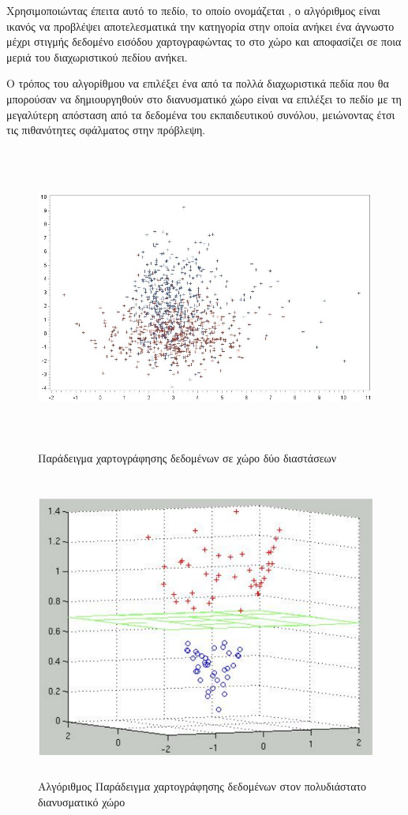 Χρησιμοποιώντας έπειτα αυτό το πεδίο, το οποίο ονομάζεται , ο αλγόριθμος είναι ικανός να προβλέψει αποτελεσματικά την κατηγορία στην οποία ανήκει ένα άγνωστο μέχρι στιγμής δεδομένο εισόδου χαρτογραφώντας το στο χώρο και αποφασίζει σε ποια μεριά του διαχωριστικού πεδίου ανήκει. 

Ο τρόπος του αλγορίθμου να επιλέξει ένα από τα πολλά διαχωριστικά πεδία που θα μπορούσαν να δημιουργηθούν στο διανυσματικό χώρο είναι να επιλέξει το πεδίο με τη μεγαλύτερη απόσταση από τα δεδομένα του εκπαιδευτικού συνόλου, μειώνοντας έτσι τις πιθανότητες σφάλματος στην πρόβλεψη.
\begin{figure}[h!]
\centering
\includegraphics[width=\textwidth,height=10cm,keepaspectratio]{pictures/2.2svmScatter.jpg}
\caption{ Παράδειγμα χαρτογράφησης δεδομένων σε χώρο δύο διαστάσεων}
\label{figure2.2}
\end{figure}

\begin{figure}[h!]
\centering
\includegraphics[width=\textwidth,height=10cm,keepaspectratio]{pictures/2.3svm.png}
\caption{Αλγόριθμος  Παράδειγμα χαρτογράφησης δεδομένων στον πολυδιάστατο διανυσματικό χώρο}
\label{figure2.3}
\end{figure}


